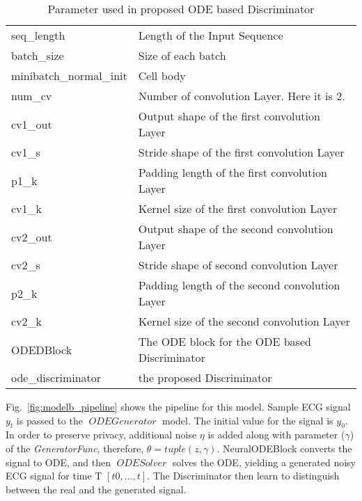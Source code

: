 \documentclass{article}
\DeclareMathOperator{\ODEGenerator}{\textit{ODEGenerator}}
\DeclareMathOperator{\ODESOLVER}{\textit{ODESolver}}
\begin{document}
\begin{table}[!htb]
	\caption{Parameter used in proposed ODE based Discriminator}
	\centering
	\begin{tabular}{ll}
		\toprule
		seq\_length & Length of the Input Sequence      \\
		batch\_size     & Size of each batch    \\
		minibatch\_normal\_init     & Cell body         \\
		
		num\_cv & Number of convolution Layer. Here it is 2.      \\
		cv1\_out     & Output shape of the first convolution Layer   \\
		cv1\_s     &  Stride shape of the first convolution Layer         \\
		p1\_k     &  Padding length of the first convolution Layer         \\
		cv1\_k     &  Kernel size of the first convolution Layer         \\
		cv2\_out     & Output shape of the second convolution Layer   \\
		cv2\_s     &  Stride shape of second convolution Layer         \\
		p2\_k     &  Padding length of the second convolution Layer         \\
		cv2\_k     &  Kernel size of the second convolution Layer         \\
	    ODEDBlock & The ODE block for the ODE based Discriminator \\
	    ode\_discriminator & the proposed Discriminator \\
		\bottomrule
	\end{tabular}
	\label{tab:desc1}
\end{table}
Fig.~\ref{fig:modelb_pipeline} shows the pipeline for this model. Sample ECG signal $y_{t}$ is passed to the $\ODEGenerator$ model. The initial value for the signal is $y_{0}$. In order to preserve privacy, additional noise $\eta$ is added along with parameter ($\gamma$) of the \textit{GeneratorFunc}, therefore, $\theta = tuple(z, \gamma)$. NeuralODEBlock converts the signal to ODE, and then $\ODESOLVER$ solves the ODE, yielding a generated noisy ECG signal for time T $[t0, ..., t]$. The Discriminator then learn to distinguish between the real and the generated signal. 
\end{document}
